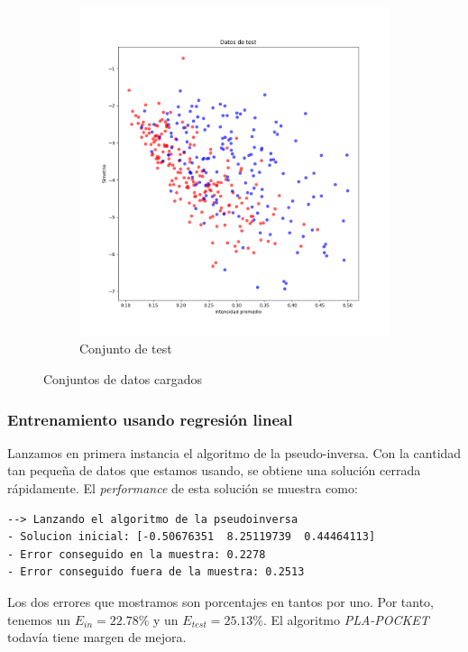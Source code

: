 \documentclass[11pt]{article}
\begin{document}
\begin{figure}[H]
\begin{subfigure}{0.4\textwidth}
        \includegraphics[scale=0.3]{bonus_testing}
        \caption{Conjunto de test}
    \end{subfigure}
    \caption{Conjuntos de datos cargados}
\end{figure}

\subsubsection{Entrenamiento usando regresión lineal}

Lanzamos en primera instancia el algoritmo de la pseudo-inversa. Con la cantidad tan pequeña de datos que estamos usando, se obtiene una solución cerrada rápidamente. El \emph{performance} de esta solución se muestra como:

\begin{lstlisting}[caption={Salida del entrenamiento de la regresión lineal}, captionpos=b]
--> Lanzando el algoritmo de la pseudoinversa
- Solucion inicial: [-0.50676351  8.25119739  0.44464113]
- Error conseguido en la muestra: 0.2278
- Error conseguido fuera de la muestra: 0.2513
\end{lstlisting}

Los dos errores que mostramos son porcentajes en tantos por uno. Por tanto, tenemos un $E_{in} = 22.78\%$ y un $E_{test} = 25.13\%$. El algoritmo \emph{PLA-POCKET} todavía tiene margen de mejora.
\end{document}
